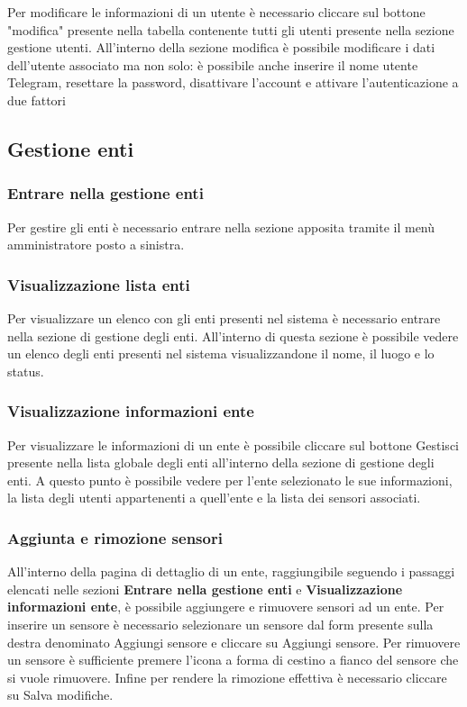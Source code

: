 		Per modificare le informazioni di un utente è necessario cliccare sul bottone "modifica" presente nella tabella contenente tutti gli utenti presente nella sezione gestione utenti. All'interno della sezione modifica è possibile modificare i dati dell'utente associato ma non solo: è possibile anche inserire il nome utente Telegram, resettare la password, disattivare l'account e attivare l'autenticazione a due fattori

\subsection{Gestione enti}
	
	\subsubsection{Entrare nella gestione enti}
		Per gestire gli enti è necessario entrare nella sezione apposita tramite il menù amministratore posto a sinistra.

	\subsubsection{Visualizzazione lista enti}
		Per visualizzare un elenco con gli enti presenti nel sistema è necessario entrare nella sezione di gestione degli enti. All'interno di questa sezione è possibile vedere un elenco degli enti presenti nel sistema visualizzandone il nome, il luogo e lo status.			

	\subsubsection{Visualizzazione informazioni ente}
		Per visualizzare le informazioni di un ente è possibile cliccare sul bottone Gestisci presente nella lista globale degli enti all'interno della sezione di gestione degli enti. A questo punto è possibile vedere per l'ente selezionato le sue informazioni, la lista degli utenti appartenenti a quell'ente e la lista dei sensori associati.

	\subsubsection{Aggiunta e rimozione sensori}
		All'interno della pagina di dettaglio di un ente, raggiungibile seguendo i passaggi elencati nelle sezioni \textbf{Entrare nella gestione enti} e \textbf{Visualizzazione informazioni ente}, è possibile aggiungere e rimuovere sensori ad un ente. Per inserire un sensore è necessario selezionare un sensore dal form presente sulla destra denominato Aggiungi sensore e cliccare su Aggiungi sensore.
		Per rimuovere un sensore è sufficiente premere l'icona a forma di cestino a fianco del sensore che si vuole rimuovere. Infine per rendere la rimozione effettiva è necessario cliccare su Salva modifiche. 

